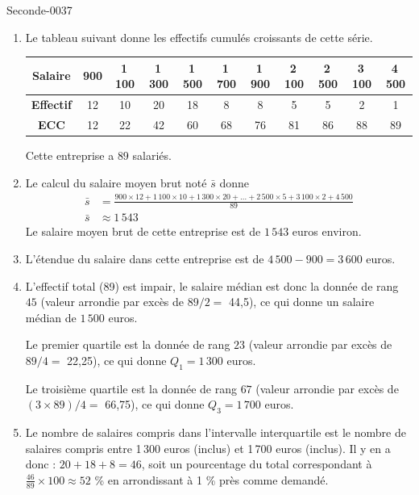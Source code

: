 
\begin{corrige}{Seconde-0037}


\begin{enumerate}

\item Le tableau suivant donne les effectifs cumulés croissants de cette série.  

  \begin{tabular}{|c||c|c|c|c|c|c|c|c|c|c|}
    \hline 
    \textbf{Salaire} &900&1\,100&1\,300&1\,500&1\,700&1\,900&2\,100&2\,500&3\,100&4\,500\\
    \hline 
    \textbf{Effectif} &12&10&20&18&8&8&5&5&2&1\\
    \hline 
    \textbf{ECC} &12&22&42&60&68&76&81&86&88&89\\
    \hline
  \end{tabular}
  
  \medskip
  Cette entreprise a $89$ salariés.
  \smallskip

\item Le calcul du salaire moyen brut noté $\bar{s}$ donne
  \begin{align*}
    \bar{s} &= 
    \frac{900\times 12 + 1\,100\times 10 + 1\,300\times 20 + \ldots+
      2\,500\times 5 + 3\,100\times 2 + 4\,500}{89}\\
    \bar{s} &\approx 1\,543
  \end{align*}
  Le salaire moyen brut de cette entreprise est de $1\,543$ euros environ.
  \smallskip

\item L'étendue du salaire dans cette entreprise est de
  $4\,500-900=3\,600$ euros.

\item L'effectif total (89) est impair, le salaire médian est donc la
  donnée de rang $45$ (valeur arrondie par excès de $89 / 2 = $ 44,5),
  ce qui donne un salaire médian de $1\,500$ euros.

  Le premier quartile est la donnée de rang $23$ (valeur arrondie par
  excès de $89 / 4 =$ 22,25), ce qui donne $Q_1 = 1\,300$ euros.

  Le troisième quartile est la donnée de rang $67$ (valeur arrondie
  par excès de $(3\times89) / 4 = $ 66,75), ce qui donne $Q_3 = 1\,700$
  euros.

\item Le nombre de salaires compris dans l'intervalle interquartile
  est le nombre de salaires compris entre 1\,300 euros (inclus) et
  1\,700 euros (inclus). Il y en a donc : $20+18+8=46$, soit un
  pourcentage du total correspondant à $\frac{46}{89}\times100\approx
  52$ \% en arrondissant à 1 \% près comme demandé.


\end{enumerate}
\end{corrige}
